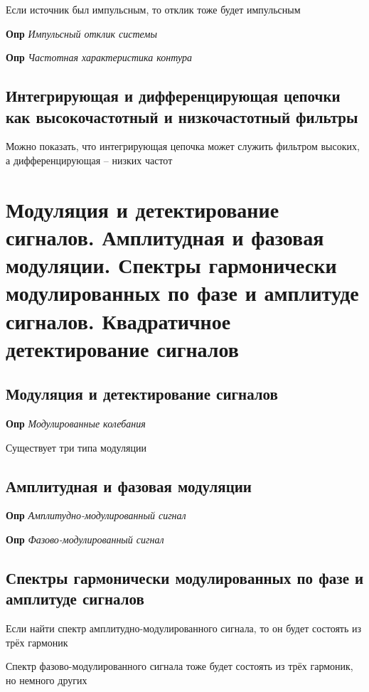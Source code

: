 \documentclass[a4paper, 14pt]{article}
\begin{document}
    Если источник был импульсным, то отклик тоже будет импульсным
    
    \textbf{Опр} \textit{Импульсный отклик системы}
    
    \textbf{Опр} \textit{Частотная характеристика контура}
    
    \subsection{Интегрирующая и дифференцирующая цепочки как высокочастотный и низкочастотный фильтры}
    
    Можно показать, что интегрирующая цепочка может служить фильтром высоких, а дифференцирующая -- низких частот
    
    \section{Модуляция и детектирование сигналов.
    Амплитудная и фазовая модуляции.
    Спектры гармонически модулированных по фазе и амплитуде сигналов.
    Квадратичное детектирование сигналов}
    
    \subsection{Модуляция и детектирование сигналов}
    
    \textbf{Опр} \textit{Модулированные колебания}
    
    Существует три типа модуляции
    
    \subsection{Амплитудная и фазовая модуляции}
    
    \textbf{Опр} \textit{Амплитудно-модулированный сигнал}
    
    \textbf{Опр} \textit{Фазово-модулированный сигнал}
    
    \subsection{Спектры гармонически модулированных по фазе и амплитуде сигналов}
    
    Если найти спектр амплитудно-модулированного сигнала, то он будет состоять из трёх гармоник
    
    Спектр фазово-модулированного сигнала тоже будет состоять из трёх гармоник, но немного других
    
\end{document}
